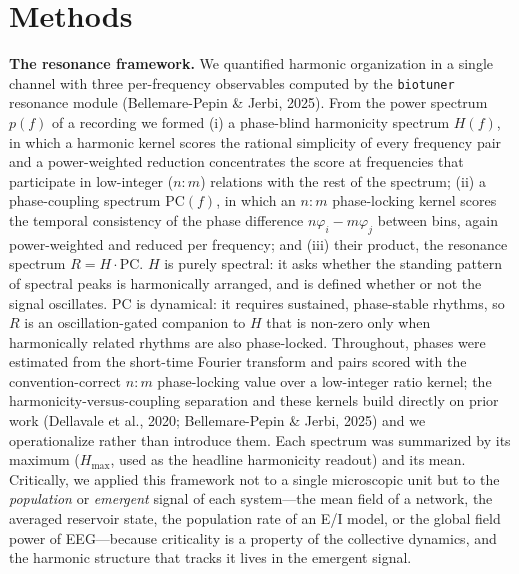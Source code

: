 \documentclass[11pt]{article}
\begin{document}
\section{Methods}
\textbf{The resonance framework.} We quantified harmonic organization in a single channel with three per-frequency observables computed by the \texttt{biotuner} resonance module (Bellemare-Pepin \& Jerbi, 2025). From the power spectrum $p(f)$ of a recording we formed (i) a phase-blind harmonicity spectrum $H(f)$, in which a harmonic kernel scores the rational simplicity of every frequency pair and a power-weighted reduction concentrates the score at frequencies that participate in low-integer ($n{:}m$) relations with the rest of the spectrum; (ii) a phase-coupling spectrum $\mathrm{PC}(f)$, in which an $n{:}m$ phase-locking kernel scores the temporal consistency of the phase difference $n\varphi_i-m\varphi_j$ between bins, again power-weighted and reduced per frequency; and (iii) their product, the resonance spectrum $R=H\cdot\mathrm{PC}$. $H$ is purely spectral: it asks whether the standing pattern of spectral peaks is harmonically arranged, and is defined whether or not the signal oscillates. $\mathrm{PC}$ is dynamical: it requires sustained, phase-stable rhythms, so $R$ is an oscillation-gated companion to $H$ that is non-zero only when harmonically related rhythms are also phase-locked. Throughout, phases were estimated from the short-time Fourier transform and pairs scored with the convention-correct $n{:}m$ phase-locking value over a low-integer ratio kernel; the harmonicity-versus-coupling separation and these kernels build directly on prior work (Dellavale et al., 2020; Bellemare-Pepin \& Jerbi, 2025) and we operationalize rather than introduce them. Each spectrum was summarized by its maximum ($H_{\max}$, used as the headline harmonicity readout) and its mean. Critically, we applied this framework not to a single microscopic unit but to the \emph{population} or \emph{emergent} signal of each system---the mean field of a network, the averaged reservoir state, the population rate of an E/I model, or the global field power of EEG---because criticality is a property of the collective dynamics, and the harmonic structure that tracks it lives in the emergent signal.
\end{document}
